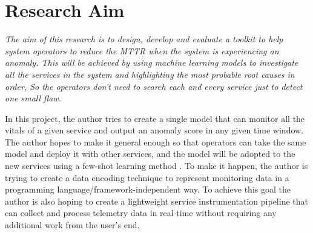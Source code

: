 \section{Research Aim}

\textit{The aim of this research is to design, develop and evaluate a toolkit to help system operators to reduce the MTTR when the system is experiencing an anomaly. This will be achieved by using machine learning models to investigate all the services in the system and highlighting the most probable root causes in order, So the operators don’t need to search each and every service just to detect one small flaw.}

In this project, the author tries to create a single model that can monitor all the vitals of a given service and output an anomaly score in any given time window. The author hopes to make it general enough so that operators can take the same model and deploy it with other services, and the model will be adopted to the new services using a few-shot learning method \citep{wang2020generalizing}. To make it happen, the author is trying to create a data encoding technique to represent monitoring data in a programming language/framework-independent way. To achieve this goal the author is also hoping to create a lightweight service instrumentation pipeline that can collect and process telemetry data in real-time without requiring any additional work from the user's end.